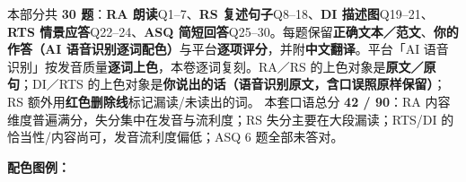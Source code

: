 
\vspace{1mm}
{\small\color{gray} 本部分共 \textbf{30 题}：\textbf{RA 朗读}Q1--7、\textbf{RS 复述句子}Q8--18、\textbf{DI 描述图}Q19--21、\textbf{RTS 情景应答}Q22--24、\textbf{ASQ 简短回答}Q25--30。每题保留\textbf{正确文本／范文}、\textbf{你的作答（AI 语音识别逐词配色）}与平台\textbf{逐项评分}，并附\textbf{中文翻译}。平台「AI 语音识别」按发音质量\textbf{逐词上色}，本卷逐词复刻。RA／RS 的上色对象是\textbf{原文／原句}；DI／RTS 的上色对象是\textbf{你说出的话（语音识别原文，含口误照原样保留）}；RS 额外用\textbf{红色删除线}标记漏读/未读出的词。
本套口语总分 \textbf{42 / 90}：RA 内容维度普遍满分，失分集中在发音与流利度；RS 失分主要在大段漏读；RTS/DI 的恰当性/内容尚可，发音流利度偏低；ASQ 6 题全部未答对。}

\vspace{1mm}
{\small\color{gray}\textbf{配色图例：}\asrlegend}
\vspace{2mm}

